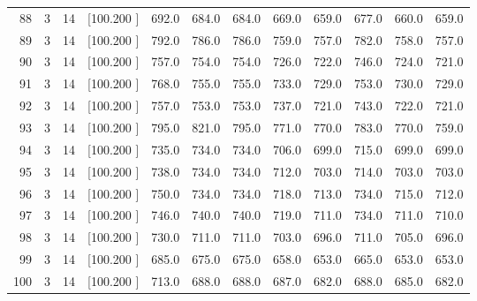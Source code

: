 \documentclass[12pt,a4paper]{article}
\begin{document}
\begin{center}
{\begin{tabular}{r r r r r r r r r r r r}
  88&  3& 14&[100.200   ]&   692.0&   684.0&   684.0&   669.0&   659.0&   677.0&   660.0&   659.0\\[-0.02in]
  89&  3& 14&[100.200   ]&   792.0&   786.0&   786.0&   759.0&   757.0&   782.0&   758.0&   757.0\\[-0.02in]
  90&  3& 14&[100.200   ]&   757.0&   754.0&   754.0&   726.0&   722.0&   746.0&   724.0&   721.0\\[-0.02in]
  91&  3& 14&[100.200   ]&   768.0&   755.0&   755.0&   733.0&   729.0&   753.0&   730.0&   729.0\\[-0.02in]
  92&  3& 14&[100.200   ]&   757.0&   753.0&   753.0&   737.0&   721.0&   743.0&   722.0&   721.0\\[-0.02in]
  93&  3& 14&[100.200   ]&   795.0&   821.0&   795.0&   771.0&   770.0&   783.0&   770.0&   759.0\\[-0.02in]
  94&  3& 14&[100.200   ]&   735.0&   734.0&   734.0&   706.0&   699.0&   715.0&   699.0&   699.0\\[-0.02in]
  95&  3& 14&[100.200   ]&   738.0&   734.0&   734.0&   712.0&   703.0&   714.0&   703.0&   703.0\\[-0.02in]
  96&  3& 14&[100.200   ]&   750.0&   734.0&   734.0&   718.0&   713.0&   734.0&   715.0&   712.0\\[-0.02in]
  97&  3& 14&[100.200   ]&   746.0&   740.0&   740.0&   719.0&   711.0&   734.0&   711.0&   710.0\\[-0.02in]
  98&  3& 14&[100.200   ]&   730.0&   711.0&   711.0&   703.0&   696.0&   711.0&   705.0&   696.0\\[-0.02in]
  99&  3& 14&[100.200   ]&   685.0&   675.0&   675.0&   658.0&   653.0&   665.0&   653.0&   653.0\\[-0.02in]
 100&  3& 14&[100.200   ]&   713.0&   688.0&   688.0&   687.0&   682.0&   688.0&   685.0&   682.0\\[-0.02in]

\hline
\end{tabular}}
\end{center}
\end{document}
